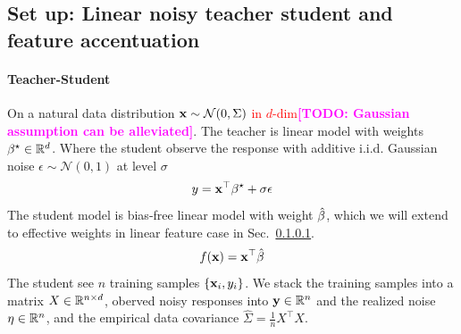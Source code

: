 \documentclass{article}
\newcommand{\red}[1]{\textcolor{red}{#1}}
\newcommand{\todo}[1]{\textcolor{magenta}{\textbf{[TODO: #1]}}}
\theoremstyle{plain}
\theoremstyle{definition}
\begin{document}
\subsection{Set up: Linear noisy teacher student and feature accentuation}

\paragraph{Teacher-Student}
On a natural data distribution \red{$\mathbf{x}\sim\mathcal{N}(0,\Sigma)$ in $d$-dim}\todo{Gaussian assumption can be alleviated}.
The teacher is linear model with weights ${\beta^{\star}}\in\mathbb{R}^d$. Where the student observe the response with additive i.i.d. Gaussian noise $\epsilon\sim\mathcal{N}(0,1)$ at level $\sigma$
\[
y=\mathbf{x}^{\top}{\beta^{\star}}+\sigma\epsilon
\]
The student model is bias-free linear model with weight $\hat{\beta}$,
which we will extend to effective weights in linear feature case in Sec.~\ref{}.
\[
f(\mathbf{x})=\mathbf{x}^{\top}\hat{\beta}
\]
The student see $n$ training samples $\{\mathbf{x}_i,y_i\}$. We stack the training samples into a matrix $X\in \mathbb{R}^{n\times d}$, oberved noisy responses into $\mathbf y\in \mathbb{R}^n$ and the realized noise $\eta\in\mathbb{R}^n$, and the empirical data covariance $\hat\Sigma=\frac{1}{n}X^\top X$.  %
\end{document}
